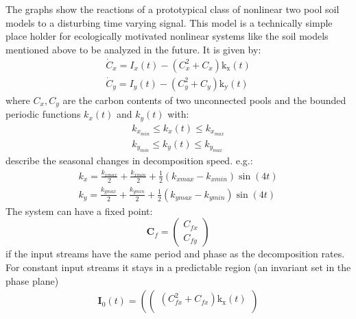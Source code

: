 
\begin{multicols}{2}
  The graphs show the reactions of a prototypical class of nonlinear two pool soil models to a disturbing time varying signal. 
  This model is a technically simple place holder for ecologically motivated nonlinear systems like the soil models mentioned above to be analyzed in the future. It is given by:\\
  \begin{eqnarray*}
  \dot{C}_x=I_{x}(t)  - \left(C_{x}^{2} + C_{x}\right) \operatorname{k_{x}}{\left (t \right )}\\
  \dot{C}_y=I_{y}(t)  - \left(C_{y}^{2} + C_{y}\right) \operatorname{k_{y}}{\left (t \right )}
  \end{eqnarray*}
  where $C_x,C_y$ are the carbon contents of two unconnected pools and the bounded  periodic functions $k_x(t) $ and $k_y(t) $ with:\\ 
  \begin{eqnarray*}
  k_{x_{min}}\le  k_x(t) \le k_{x_{max}} \\k_{y_{min}} \le  k_y(t) \le k_{y_{max}}
  \end{eqnarray*}
  describe the seasonal changes in decomposition speed.
  e.g.:\\ 
  \begin{eqnarray*}
  k_x=\frac{k_{xmax}}{2} + \frac{k_{xmin}}{2} + \frac{1}{2} \left(k_{xmax} - k_{xmin}\right) \sin{\left (4 t \right )}\\k_y=\frac{k_{ymax}}{2} + \frac{k_{ymin}}{2} + \frac{1}{2} \left(k_{ymax} - k_{ymin}\right) \sin{\left (4 t \right )}
  \end{eqnarray*}
  The system can have a fixed point: 
  $$ \mathbf{C}_f= \begin{pmatrix} C_{fx} \\ C_{fy} \end{pmatrix} $$
  if the input streams have the same period and phase as the decomposition rates. For constant input streams it stays in a predictable region (an invariant set in the phase plane) \\ 
  \begin{eqnarray*}
  \mathbf{I}_0(t)=\left(
      \begin{pmatrix}
        \left( C_{fx}^{2} + C_{fx} \right) \operatorname{k_{x}}{\left (t \right )}\\

\end{pmatrix}
\end{eqnarray*}
\end{multicols}

